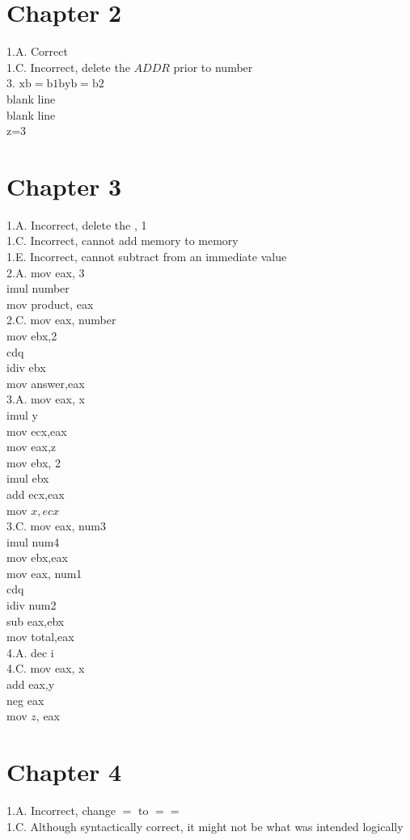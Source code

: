 \documentclass[10pt]{article}
\begin{document}
\section*{Chapter 2}
1.A. Correct\\
1.C. Incorrect, delete the $A D D R$ prior to number\\
3. $\mathrm{xb}=\mathrm{b} 1 \mathrm{byb}=\mathrm{b} 2$\\
blank line\\
blank line\\
z=3

\section*{Chapter 3}
1.A. Incorrect, delete the , 1\\
1.C. Incorrect, cannot add memory to memory\\
1.E. Incorrect, cannot subtract from an immediate value\\
2.A. mov eax, 3\\
imul number\\
mov product, eax\\
2.C. mov eax, number\\
mov ebx,2\\
cdq\\
idiv ebx\\
mov answer,eax\\
3.A. mov eax, x\\
imul y\\
mov ecx,eax\\
mov eax,z\\
mov ebx, 2\\
imul ebx\\
add ecx,eax\\
mov $x, e c x$\\
3.C. mov eax, num3\\
imul num4\\
mov ebx,eax\\
mov eax, num1\\
cdq\\
idiv num2\\
sub eax,ebx\\
mov total,eax\\
4.A. dec i\\
4.C. mov eax, x\\
add eax,y\\
neg eax\\
mov $z$, eax

\section*{Chapter 4}
1.A. Incorrect, change $=$ to $==$\\
1.C. Although syntactically correct, it might not be what was intended logically
\end{document}
